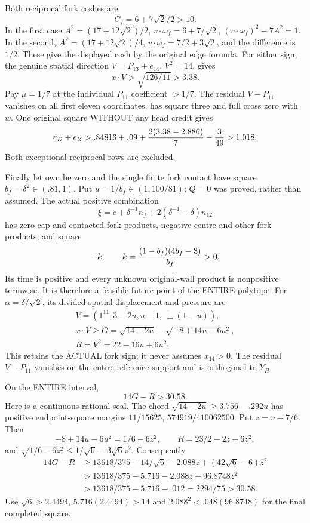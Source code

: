 Both reciprocal fork coshes are
\[
                         C_f=6+7\sqrt2/2>10 .
\]
In the first case
\(A^2=(17+12\sqrt2)/2\),
\(v\cdot\omega_f=6+7/\sqrt2\),
\((v\cdot\omega_f)^2-7A^2=1\).
In the second,
\(A^2=(17+12\sqrt2)/4\),
\(v\cdot\omega_f=7/2+3\sqrt2\),
and the difference is \(1/2\).
These give the displayed cosh by the original
edge formula.
For either sign, the genuine spatial direction
\(V=P_{13}\pm e_{14}\), \(V^2=14\), gives
\[
                 x\cdot V>\sqrt{126/11}>3.38 .
\]
Pay \(\mu=1/7\) at the individual \(P_{11}\)
coefficient \(>1/7\).
The residual \(V-P_{11}\) vanishes on all first
eleven coordinates, has square three and full
cross zero with \(w\).
One original square WITHOUT any head credit gives
\[
          e_D+e_Z>.84816+.09+
                      {2(3.38-2.886)\over7}-{3\over49}>1.018.
\]
Both exceptional reciprocal rows are excluded.

Finally let own be zero and the single finite fork
contact have square \(b_f=\delta^2\in(.81,1)\).
Put \(u=1/b_f\in(1,100/81)\); \(Q=0\) was proved,
rather than assumed.
The actual positive combination
\[
               \xi=c+\delta^{-1}n_f
                           +2(\delta^{-1}-\delta)n_{12}
\]
has zero cap and contacted-fork products, negative
centre and other-fork products, and square
\[
                   -k,\qquad k={(1-b_f)(4b_f-3)\over b_f}>0 .
\]
Its time is positive and every unknown original-wall
product is nonpositive termwise.
It is therefore a feasible future point of the
ENTIRE polytope.
For \(\alpha=\delta/\sqrt2\), its divided spatial
displacement and pressure are
\[
 \begin{gathered}
 V=(1^{11},3-2u,u-1,\ \pm(1-u)),\\
 x\cdot V\ge G=\sqrt{14-2u}-\sqrt{-8+14u-6u^2},\\
 R=V^2=22-16u+6u^2 .
 \end{gathered}
\]
This retains the ACTUAL fork sign; it never assumes
\(x_{14}>0\).
The residual \(V-P_{11}\) vanishes on the entire
reference support and is orthogonal to \(Y_H\).

On the ENTIRE interval,
\[
                             14G-R>30.58 .
\]
Here is a continuous rational seal.
The chord
\(\sqrt{14-2u}\ge3.756-.292u\)
has positive endpoint-square margins
\(11/15625\), \(574919/410062500\).
Put \(z=u-7/6\).
Then
\[
 -8+14u-6u^2=1/6-6z^2,\qquad
 R=23/2-2z+6z^2,
\]
and
\(\sqrt{1/6-6z^2}\le1/\sqrt6-3\sqrt6z^2\).
Consequently
\[
 \begin{split}
 14G-R
 &\ge13618/375-14/\sqrt6-2.088z+(42\sqrt6-6)z^2\\
 &>13618/375-5.716-2.088z+96.8748z^2\\
 &>13618/375-5.716-.012=2294/75>30.58 .
 \end{split}
\]
Use \(\sqrt6>2.4494\), \(5.716(2.4494)>14\)
and \(2.088^2<.048(96.8748)\) for the final
completed square.

